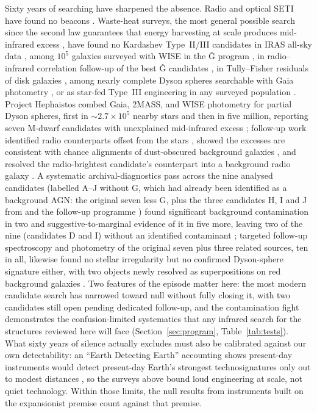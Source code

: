 \documentclass[11pt]{article}
\begin{document}
Sixty years of searching have sharpened the absence. Radio and optical SETI have found no beacons \citep{Tarter2001,Enriquez2017,Huang2026}. Waste-heat surveys, the most general possible search since the second law guarantees that energy harvesting at scale produces mid-infrared excess \citep{Dyson1960}, have found no Kardashev Type~II/III candidates in IRAS all-sky data \citep{Carrigan2009}, among $10^{5}$ galaxies surveyed with WISE in the \^G program \citep{Wright2014,Wright2014b,Griffith2015}, in radio--infrared correlation follow-up of the best \^G candidates \citep{Garrett2015}, in Tully--Fisher residuals of disk galaxies \citep{Zackrisson2015}, among nearly complete Dyson spheres searchable with Gaia photometry \citep{Zackrisson2018}, or as star-fed Type~III engineering in any surveyed population \citep{Annis1999}. Project Hephaistos combed Gaia, 2MASS, and WISE photometry for partial Dyson spheres, first in $\sim$$2.7\times10^{5}$ nearby stars \citep{Suazo2022} and then in five million, reporting seven M-dwarf candidates with unexplained mid-infrared excess \citep{Suazo2024}; follow-up work identified radio counterparts offset from the stars \citep{Ren2024}, showed the excesses are consistent with chance alignments of dust-obscured background galaxies \citep{Blain2024}, and resolved the radio-brightest candidate's counterpart into a background radio galaxy \citep{Ren2025}. A systematic archival-diagnostics pass across the nine analysed candidates (labelled A--J without G, which had already been identified as a background AGN: the original seven less G, plus the three candidates H, I and J from \citet{Suazo2024thesis} and the follow-up programme \citep{Korn2026Hephaistos3}) found significant background contamination in two and suggestive-to-marginal evidence of it in five more, leaving two of the nine (candidates D and I) without an identified contaminant \citep{Ren2026Diagnostics}; targeted follow-up spectroscopy and photometry of the original seven plus three related sources, ten in all, likewise found no stellar irregularity but no confirmed Dyson-sphere signature either, with two objects newly resolved as superpositions on red background galaxies \citep{Korn2026Hephaistos3}. Two features of the episode matter here: the most modern candidate search has narrowed toward null without fully closing it, with two candidates still open pending dedicated follow-up, and the contamination fight demonstrates the confusion-limited systematics that any infrared search for the structures reviewed here will face (Section~\ref{sec:program}, Table~\ref{tab:tests}). What sixty years of silence actually excludes must also be calibrated against our own detectability: an ``Earth Detecting Earth'' accounting shows present-day instruments would detect present-day Earth's strongest technosignatures only out to modest distances \citep{Sheikh2025}, so the surveys above bound loud engineering at scale, not quiet technology. Within those limits, the null results from instruments built on the expansionist premise count against that premise.
\end{document}
